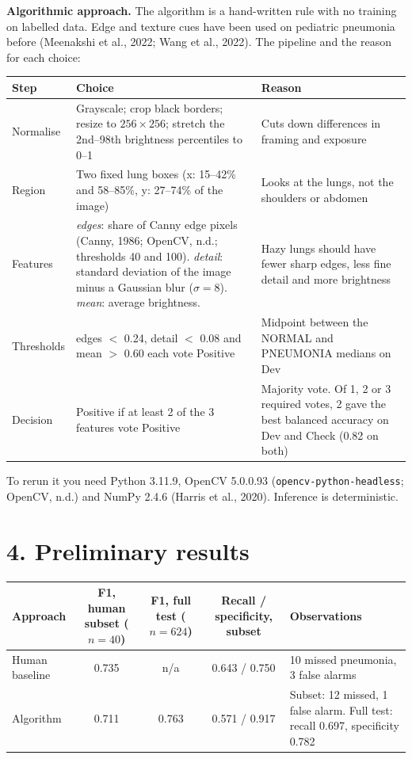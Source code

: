 \documentclass[11pt,letterpaper]{article}
\begin{document}
\textbf{Algorithmic approach.} The algorithm is a hand-written rule with no training on labelled data. Edge and texture cues have been used on pediatric pneumonia before (Meenakshi et al., 2022; Wang et al., 2022). The pipeline and the reason for each choice:

\begin{tabularx}{\textwidth}{|l|Y|Y|}
\hline
\textbf{Step} & \textbf{Choice} & \textbf{Reason} \\ \hline
Normalise & Grayscale; crop black borders; resize to $256\times256$; stretch the 2nd--98th brightness percentiles to 0--1 & Cuts down differences in framing and exposure \\ \hline
Region & Two fixed lung boxes (x: 15--42\% and 58--85\%, y: 27--74\% of the image) & Looks at the lungs, not the shoulders or abdomen \\ \hline
Features & \textit{edges}: share of Canny edge pixels (Canny, 1986; OpenCV, n.d.; thresholds 40 and 100). \textit{detail}: standard deviation of the image minus a Gaussian blur ($\sigma = 8$). \textit{mean}: average brightness. & Hazy lungs should have fewer sharp edges, less fine detail and more brightness \\ \hline
Thresholds & edges $<$ 0.24, detail $<$ 0.08 and mean $>$ 0.60 each vote Positive & Midpoint between the NORMAL and PNEUMONIA medians on Dev \\ \hline
Decision & Positive if at least 2 of the 3 features vote Positive & Majority vote. Of 1, 2 or 3 required votes, 2 gave the best balanced accuracy on Dev and Check (0.82 on both) \\ \hline
\end{tabularx}

To rerun it you need Python 3.11.9, OpenCV 5.0.0.93 (\texttt{opencv-python-headless}; OpenCV, n.d.) and NumPy 2.4.6 (Harris et al., 2020). Inference is deterministic.

\section{4. Preliminary results}

\begin{tabularx}{\textwidth}{|l|C|C|C|Y|}
\hline
\textbf{Approach} & \textbf{F1, human subset ($n = 40$)} & \textbf{F1, full test ($n = 624$)} & \textbf{Recall / specificity, subset} & \textbf{Observations} \\ \hline
Human baseline & 0.735 & n/a & 0.643 / 0.750 & 10 missed pneumonia, 3 false alarms \\ \hline
Algorithm & 0.711 & 0.763 & 0.571 / 0.917 & Subset: 12 missed, 1 false alarm. Full test: recall 0.697, specificity 0.782 \\ \hline
\end{tabularx}
\end{document}
